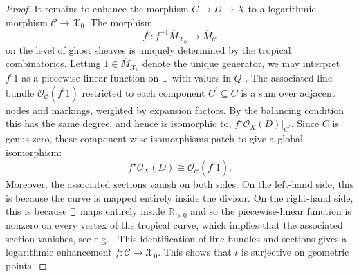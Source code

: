 \documentclass[11pt]{amsart}
\theoremstyle{definition}
\theoremstyle{definition}
\newcommand{\RR}{\mathbb{R}}
\newcommand{\sqC}{\scalebox{0.8}[1.2]{$\sqsubset$}}
\newcommand{\ol}[1]{\overline{#1}}
\newcommand{\OO}{\mathcal{O}}
\newcommand{\Xcal}{\mathcal{X}}
\newcommand{\Ccal}{\mathcal{C}}
\begin{document}
\begin{proof}
It remains to enhance the morphism $C \to D \to X$ to a logarithmic morphism $\Ccal \to \Xcal_0$. The morphism
\begin{equation*} f^\flat \colon f^{-1} \ol{M}_{\Xcal_0} \to \ol{M}_{\Ccal} \end{equation*}
on the level of ghost sheaves is uniquely determined by the tropical combinatorics. Letting $1\in\ol{M}_{\Xcal_0}$ denote the unique generator, we may interpret $f^\flat 1$ as a piecewise-linear function on $\sqC$ with values in $Q$ \cite[Remark 7.3]{CavalieriChanUlirschWise}. The associated line bundle $\OO_{\Ccal}(f^\flat 1)$ restricted to each component $C^\prime \subseteq C$ is a sum over adjacent nodes and markings, weighted by expansion factors. By the balancing condition this has the same degree, and hence is isomorphic to, $f^\star \OO_X(D)|_{C^\prime}$. Since $C$ is genus zero, these component-wise isomorphisms patch to give a global isomorphism:
\begin{equation*} f^\star \OO_X(D) \cong \OO_{\Ccal}(f^\flat 1).\end{equation*}
Moreover, the associated sections vanish on both sides. On the left-hand side, this is because the curve is mapped entirely inside the divisor. On the right-hand side, this is because $\sqC$ maps entirely inside $\RR_{>0}$ and so the piecewise-linear function is nonzero on every vertex of the tropical curve, which implies that the associated section vanishes, see e.g. \cite[Propositon~2.4.1]{RanganathanSantosParkerWise1}. This identification of line bundles and sections gives a logarithmic enhancement $f \colon \Ccal \to \Xcal_0$. This shows that $\iota$ is surjective on geometric points.


\end{proof}
\end{document}
